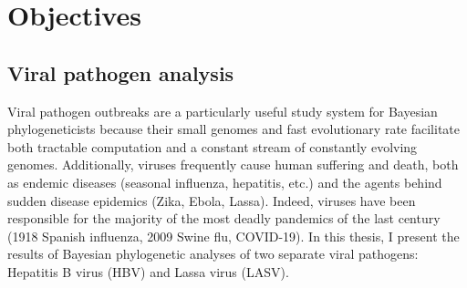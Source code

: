 \chapter{Objectives}
\label{ch:objectives}


\section{Viral pathogen analysis}

Viral pathogen outbreaks are a particularly useful study system for Bayesian phylogeneticists because their small genomes and fast evolutionary rate facilitate both tractable computation and a constant stream of constantly evolving genomes. %
Additionally, viruses frequently cause human suffering and death, both as endemic diseases (seasonal influenza, hepatitis, etc.) and the agents behind sudden disease epidemics (Zika, Ebola, Lassa).
Indeed, viruses have been responsible for the majority of the most deadly pandemics of the last century (1918 Spanish influenza, 2009 Swine flu, COVID-19).
In this thesis, I present the results of Bayesian phylogenetic analyses of two separate viral pathogens: Hepatitis B virus (HBV) and Lassa virus (LASV). %

%


